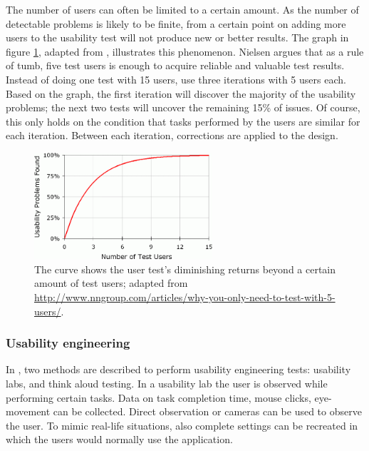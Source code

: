 The number of users can often be limited to a certain amount. As the number of detectable problems is likely to be finite, from a certain point on adding more users to the usability test will not produce new or better results\cite{duval:2012:chi:evaluation, nielsen:2012:nngroup:diminishing_returns}. The graph in figure \ref{fig:nielsengraph}, adapted from \cite{nielsen:2012:nngroup:diminishing_returns}, illustrates this phenomenon. Nielsen argues that as a rule of tumb, five test users is enough to acquire reliable and valuable test results. Instead of doing one test with 15 users, use three iterations with 5 users each. Based on the graph, the first iteration will discover the majority of the usability problems; the next two tests will uncover the remaining 15\% of issues. Of course, this only holds on the condition that tasks performed by the users are similar for each iteration. Between each iteration, corrections are applied to the design\cite{nielsen:2012:nngroup:diminishing_returns}.

\begin{figure}
	\begin{center}
		\includegraphics[width=250px]{img/nielsen2012_usertests}
	\end{center}
	\caption{The curve shows the user test's diminishing returns beyond a certain amount of test users; adapted from \url{http://www.nngroup.com/articles/why-you-only-need-to-test-with-5-users/}.}
	\label{fig:nielsengraph}
\end{figure}


\subsubsection{Usability engineering}

In \cite{duval:2012:chi:evaluation}, two methods are described to perform usability engineering tests: usability labs, and think aloud testing. In a usability lab the user is observed while performing certain tasks. Data on task completion time, mouse clicks, eye-movement can be collected. Direct observation or cameras can be used to observe the user. To mimic real-life situations, also complete settings can be recreated in which the users would normally use the application\cite{duval:2012:chi:evaluation}.

